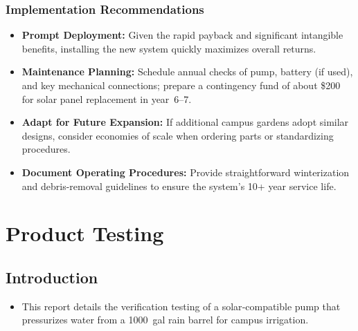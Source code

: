 \documentclass[12pt]{report}
\begin{document}
\subsection{Implementation Recommendations}
\begin{itemize}
    \item \textbf{Prompt Deployment:} Given the rapid payback and significant intangible benefits, installing the new system quickly maximizes overall returns.
    \item \textbf{Maintenance Planning:} Schedule annual checks of pump, battery (if used), and key mechanical connections; prepare a contingency fund of about \$200 for solar panel replacement in year~6--7.
    \item \textbf{Adapt for Future Expansion:} If additional campus gardens adopt similar designs, consider economies of scale when ordering parts or standardizing procedures.
    \item \textbf{Document Operating Procedures:} Provide straightforward winterization and debris-removal guidelines to ensure the system’s 10+ year service life.
\end{itemize}



\chapter{Product Testing}
\section{Introduction}
\begin{itemize}[leftmargin=*]
  \item This report details the verification testing of a solar‐compatible pump that pressurizes water from a 1000 gal rain barrel for campus irrigation.
\end{itemize}
\end{document}
